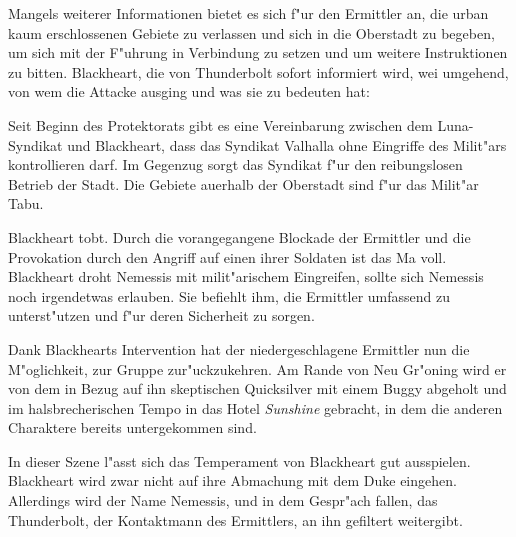 Mangels weiterer Informationen bietet es sich f"ur den Ermittler an, die urban kaum erschlossenen Gebiete zu verlassen und sich in die Oberstadt zu begeben, um sich mit der F"uhrung in Verbindung zu setzen und um weitere Instruktionen zu bitten. Blackheart, die von Thunderbolt sofort informiert wird, wei\3 umgehend, von wem die Attacke ausging und was sie zu bedeuten hat:

Seit Beginn des Protektorats gibt es eine Vereinbarung zwischen dem Luna-Syndikat und Blackheart, dass das Syndikat Valhalla ohne Eingriffe des Milit"ars kontrollieren darf. Im Gegenzug sorgt das Syndikat f"ur den reibungslosen Betrieb der Stadt. Die Gebiete au\3erhalb der Oberstadt sind f"ur das Milit"ar Tabu.

Blackheart tobt. Durch die vorangegangene Blockade der Ermittler und die Provokation durch den Angriff auf einen ihrer Soldaten ist das Ma\3 voll. Blackheart droht Nemessis mit milit"arischem Eingreifen, sollte sich Nemessis noch irgendetwas erlauben. Sie befiehlt ihm, die Ermittler umfassend zu unterst"utzen und f"ur deren Sicherheit zu sorgen.

Dank Blackhearts Intervention hat der niedergeschlagene Ermittler nun die M"oglichkeit, zur Gruppe zur"uckzukehren. Am Rande von Neu Gr"oning wird er von dem in Bezug auf ihn skeptischen Quicksilver mit einem Buggy abgeholt und im halsbrecherischen Tempo in das Hotel \emph{Sunshine} gebracht, in dem die anderen Charaktere bereits untergekommen sind.

\begin{remarks}
	In dieser Szene l"asst sich das Temperament von Blackheart gut ausspielen. Blackheart wird zwar nicht auf ihre Abmachung mit dem Duke eingehen. Allerdings wird der Name Nemessis,  und  in dem Gespr"ach fallen, das Thunderbolt, der Kontaktmann des Ermittlers, an ihn gefiltert weitergibt.
\end{remarks}
